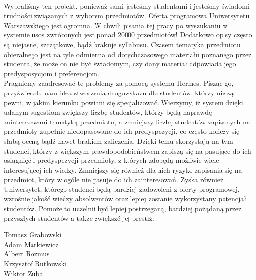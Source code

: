 \documentclass[licencjacka]{pracamgr}
\begin{document}
~\\ \indent Wybraliśmy ten projekt, ponieważ sami jesteśmy studentami i jesteśmy świadomi trudności związanych z wyborem przedmiotów. Oferta programowa Uniwersytetu Warszawskiego jest ogromna. W chwili pisania tej pracy po wyszukaniu w systemie usos zwróconych jest ponad 20000 przedmiotów! Dodatkowo opisy często są niejasne, szczątkowe, bądź brakuje syllabusu. Czasem tematyka przedmiotu obieralnego jest na tyle odmienna od dotychczasowego materiału poznanego przez studenta, że może on nie być świadomym, czy dany materiał odpowiada jego predyspozycjom i preferencjom.
\\ \indent Pragniemy zaadresować te problemy za pomocą systemu Hermes. Pisząc go, przyświecała nam idea stworzenia drogowskazu dla studentów, którzy nie są pewni, w jakim kierunku powinni się specjalizować. Wierzymy, iż system dzięki udanym sugestiom zwiększy liczbę studentów, którzy będą naprawdę zainteresowani tematyką przedmiotu, a zmniejszy liczbę studentów zapisanych na przedmioty zupełnie niedopasowane do ich predyspozycji, co często kończy się słabą oceną bądź nawet brakiem zaliczenia. Dzięki temu skorzystają na tym studenci, którzy z większym prawdopodobieństwem zapiszą się na pasujące do ich osiągnięć i predyspozycji przedmioty, z których zdobędą możliwie wiele interesującej ich wiedzy. Zmniejszy się również dla nich ryzyko zapisania się na przedmiot, który w ogóle nie pasuje do ich zainteresowań. Zyska również Uniwersytet, którego studenci będą bardziej zadowoleni z oferty programowej, wzrośnie jakość wiedzy absolwentów oraz lepiej zostanie wykorzystany potencjał studentów. Pomoże to uczelnii być lepiej postrzeganą, bardziej pożądaną przez przyszłych studentów a także zwiększć jej prestiż.
\\ 
\begin{flushright}
Tomasz Grabowski \\
Adam Markiewicz \\
Albert Rozmus \\
Krzysztof Rutkowski \\
Wiktor Zuba 
\end{flushright}
\end{document}
